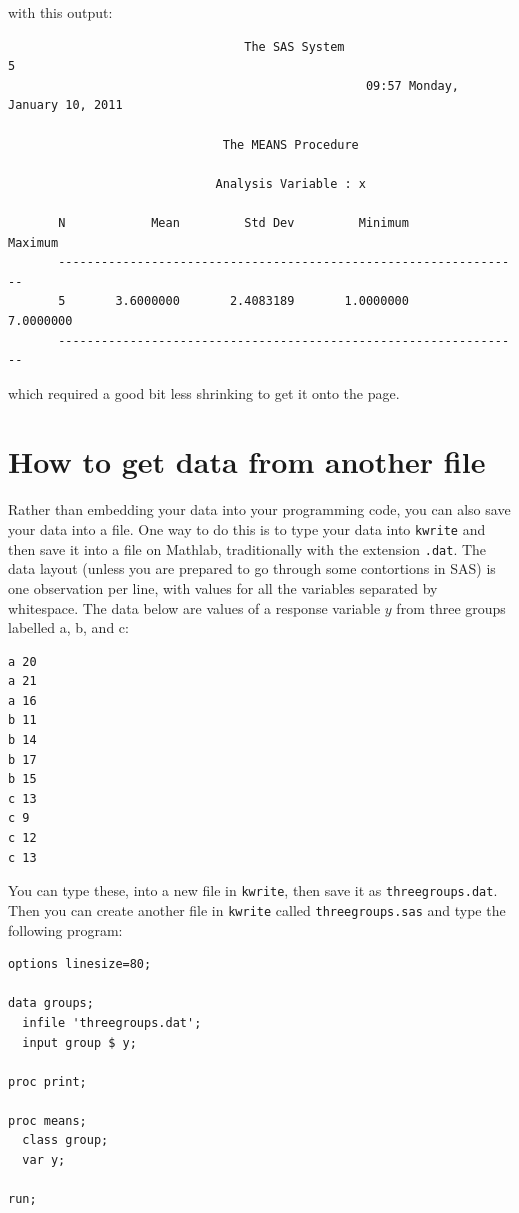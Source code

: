 \documentclass[11pt]{article}
\begin{document}
with this output:

\filbreak
{\small
\begin{verbatim}
                                 The SAS System                                5
                                                  09:57 Monday, January 10, 2011

                              The MEANS Procedure

                             Analysis Variable : x

       N            Mean         Std Dev         Minimum         Maximum
       -----------------------------------------------------------------
       5       3.6000000       2.4083189       1.0000000       7.0000000
       -----------------------------------------------------------------
\end{verbatim}
}
\filbreak

which required a good bit less shrinking to get it onto the page.

\section{How to get data from another file}

Rather than embedding your data into your programming code, you can
also save your data into a file. One way to do this is to type your
data into \texttt{kwrite} and then save it into a file on
Mathlab, traditionally with the extension \verb-.dat-. The data layout
(unless you are prepared to go through some contortions in SAS) is one
observation per line, with values for all the variables separated by
whitespace. The data below are values of a response variable $y$ from
three groups labelled a, b, and c:

\filbreak
\begin{verbatim}
a 20
a 21
a 16
b 11
b 14
b 17
b 15
c 13
c 9
c 12
c 13
\end{verbatim}
\filbreak

You can type these, into a new file in \texttt{kwrite}, then save it
as \verb-threegroups.dat-. Then you can create another file in
\texttt{kwrite} called \texttt{threegroups.sas}
and type the following program:

\filbreak
\begin{verbatim}
options linesize=80;

data groups;
  infile 'threegroups.dat';
  input group $ y;

proc print;

proc means;
  class group;
  var y;

run;
\end{verbatim}
\filbreak
\end{document}
